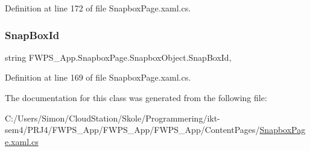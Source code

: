 Definition at line 172 of file Snapbox\+Page.\+xaml.\+cs.

\mbox{\label{class_f_w_p_s___app_1_1_snapbox_page_1_1_snapbox_object_ae0b7c5f85820765cd812159c904f7fb1}} 
\subsubsection{\texorpdfstring{Snap\+Box\+Id}{SnapBoxId}}
{\footnotesize\ttfamily string F\+W\+P\+S\+\_\+\+App.\+Snapbox\+Page.\+Snapbox\+Object.\+Snap\+Box\+Id\hspace{0.3cm}{\ttfamily [get]}, {\ttfamily [set]}}



Definition at line 169 of file Snapbox\+Page.\+xaml.\+cs.



The documentation for this class was generated from the following file\+:\begin{DoxyCompactItemize}
\item 
C\+:/\+Users/\+Simon/\+Cloud\+Station/\+Skole/\+Programmering/ikt-\/sem4/\+P\+R\+J4/\+F\+W\+P\+S\+\_\+\+App/\+F\+W\+P\+S\+\_\+\+App/\+F\+W\+P\+S\+\_\+\+App/\+Content\+Pages/\mbox{\hyperlink{_snapbox_page_8xaml_8cs}{Snapbox\+Page.\+xaml.\+cs}}\end{DoxyCompactItemize}
